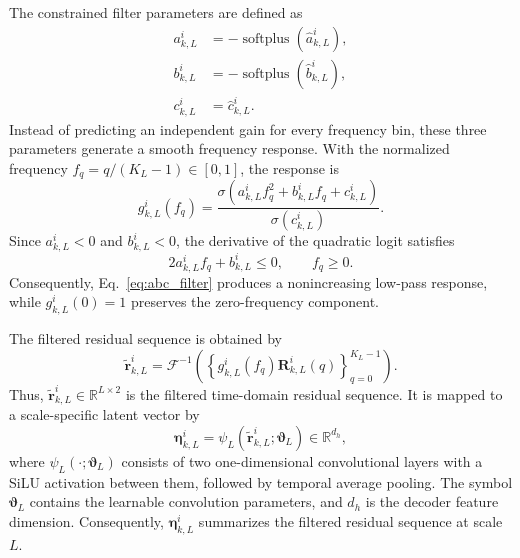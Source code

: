\documentclass[10pt,doublecolumn]{IEEEtaes}
\begin{document}
The constrained filter parameters are defined as
\begin{equation}
	\begin{aligned}
		a_{k,L}^{i}
		&=-\operatorname{softplus}
		\left(\hat a_{k,L}^{i}\right),\\
		b_{k,L}^{i}
		&=-\operatorname{softplus}
		\left(\hat b_{k,L}^{i}\right),\\
		c_{k,L}^{i}
		&=\hat c_{k,L}^{i}.
	\end{aligned}
	\label{eq:abc_parameter_constraints}
\end{equation}
Instead of predicting an independent gain for every frequency bin,
these three parameters generate a smooth frequency response. With the
normalized frequency
$f_q=q/(K_L-1)\in[0,1]$, the response is
\begin{equation}
	g_{k,L}^{i}(f_q)
	=
	\frac{
		\sigma\left(
		a_{k,L}^{i}f_q^2+
		b_{k,L}^{i}f_q+
		c_{k,L}^{i}
		\right)
	}{
		\sigma\left(c_{k,L}^{i}\right)
	}.
	\label{eq:abc_filter}
\end{equation}
Since $a_{k,L}^{i}<0$ and $b_{k,L}^{i}<0$, the derivative of the
quadratic logit satisfies
\begin{equation}
	2a_{k,L}^{i}f_q+b_{k,L}^{i}\leq 0,
	\qquad f_q\geq0.
\end{equation}
Consequently, Eq.~\eqref{eq:abc_filter} produces a nonincreasing
low-pass response, while
$g_{k,L}^{i}(0)=1$ preserves the zero-frequency component.
 
The filtered residual sequence is obtained by
\begin{equation}
	\tilde{\mathbf{r}}_{k,L}^{i}
	=
	\mathcal{F}^{-1}
	\left(
	\left\{
	g_{k,L}^{i}(f_q)
	\mathbf{R}_{k,L}^{i}(q)
	\right\}_{q=0}^{K_L-1}
	\right).
	\label{eq:filtered_residual_sequence}
\end{equation}
Thus,
$\tilde{\mathbf{r}}_{k,L}^{i}\in\mathbb{R}^{L\times2}$
is the filtered time-domain residual sequence. It is mapped to a
scale-specific latent vector by
\begin{equation}
	\boldsymbol{\eta}_{k,L}^{i}
	=
	\psi_L
	\left(
	\tilde{\mathbf{r}}_{k,L}^{i};
	\boldsymbol{\vartheta}_L
	\right)
	\in\mathbb{R}^{d_h},
	\label{eq:scale_temporal_latent}
\end{equation}
where $\psi_L(\cdot;\boldsymbol{\vartheta}_L)$ consists of two
one-dimensional convolutional layers with a SiLU activation between
them, followed by temporal average pooling.
The symbol $\boldsymbol{\vartheta}_L$ contains the learnable convolution parameters, and $d_h$ is the decoder feature dimension. Consequently, $\boldsymbol{\eta}_{k,L}^{i}$ summarizes the filtered residual sequence at scale $L$.
\end{document}
